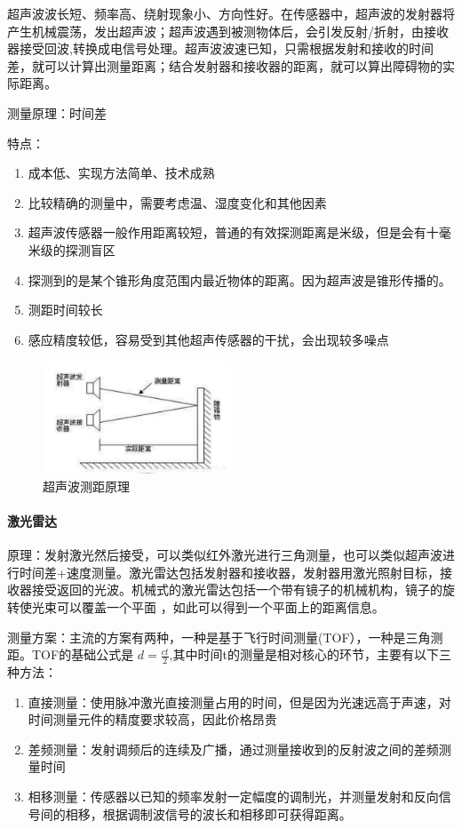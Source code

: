 \documentclass{report}
\begin{document}
超声波波长短、频率高、绕射现象小、方向性好。在传感器中，超声波的发射器将产生机械震荡，发出超声波；超声波遇到被测物体后，会引发反射/折射，由接收器接受回波,转换成电信号处理。超声波波速已知，只需根据发射和接收的时间差，就可以计算出测量距离；结合发射器和接收器的距离，就可以算出障碍物的实际距离。

测量原理：时间差

特点：
\begin{enumerate}
\item 成本低、实现方法简单、技术成熟
\item 比较精确的测量中，需要考虑温、湿度变化和其他因素
\item 超声波传感器一般作用距离较短，普通的有效探测距离是米级，但是会有十毫米级的探测盲区
\item 探测到的是某个锥形角度范围内最近物体的距离。因为超声波是锥形传播的。
\item 测距时间较长
  \item 感应精度较低，容易受到其他超声传感器的干扰，会出现较多噪点\cite{jh1}
  \end{enumerate}
  \begin{figure}[ht]
    \centering
    \includegraphics[width=0.5\textwidth]{figures/super.png}
    \caption{超声波测距原理 }
  \end{figure}

  \paragraph{激光雷达}
  
原理：发射激光然后接受，可以类似红外激光进行三角测量，也可以类似超声波进行时间差+速度测量。激光雷达包括发射器和接收器，发射器用激光照射目标，接收器接受返回的光波。机械式的激光雷达包括一个带有镜子的机械机构，镜子的旋转使光束可以覆盖一个平面 ，如此可以得到一个平面上的距离信息。

测量方案：主流的方案有两种，一种是基于飞行时间测量(TOF），一种是三角测距。TOF的基础公式是 \( d=\frac{ct}{2} \),其中时间t的测量是相对核心的环节，主要有以下三种方法：
\begin{enumerate}
\item 直接测量：使用脉冲激光直接测量占用的时间，但是因为光速远高于声速，对时间测量元件的精度要求较高，因此价格昂贵
\item 差频测量：发射调频后的连续及广播，通过测量接收到的反射波之间的差频测量时间
  \item 相移测量：传感器以已知的频率发射一定幅度的调制光，并测量发射和反向信号间的相移，根据调制波信号的波长和相移即可获得距离。
\end{enumerate}
\end{document}

